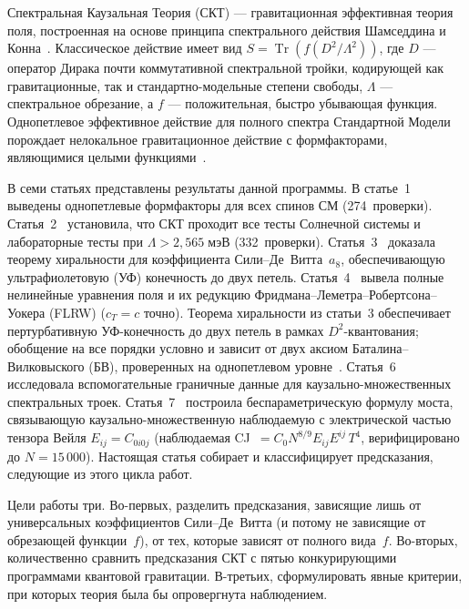 \documentclass[12pt,a4paper]{article}
\theoremstyle{plain}
\theoremstyle{definition}
\theoremstyle{remark}
\newcommand{\Tr}{\operatorname{Tr}}
\newcommand{\Esq}{E_{ij}E^{ij}}
\begin{document}
Спектральная Каузальная Теория (СКТ) --- гравитационная эффективная
теория поля, построенная на основе принципа спектрального действия
Шамседдина и Конна~\cite{CC:1996,CC:1997}. Классическое действие
имеет вид $S = \Tr(f(D^2/\Lambda^2))$, где $D$ --- оператор Дирака
почти коммутативной спектральной тройки, кодирующей как гравитационные,
так и стандартно-модельные степени свободы, $\Lambda$ --- спектральное
обрезание, а $f$ --- положительная, быстро убывающая функция.
Однопетлевое эффективное действие для полного спектра Стандартной
Модели порождает нелокальное гравитационное действие с формфакторами,
являющимися целыми функциями~\cite{Alfyorov:2026paper1}.

В семи статьях представлены результаты данной программы. В
статье~1~\cite{Alfyorov:2026paper1} выведены однопетлевые формфакторы
для всех спинов СМ (274~проверки).
Статья~2~\cite{Alfyorov:2026paper2} установила, что СКТ проходит все
тесты Солнечной системы и лабораторные тесты при
$\Lambda > 2{,}565\;\text{мэВ}$ (332~проверки).
Статья~3~\cite{Alfyorov:2026paper3} доказала теорему хиральности
для коэффициента Сили--Де~Витта~$a_8$, обеспечивающую ультрафиолетовую (УФ) конечность
до двух петель.
Статья~4~\cite{Alfyorov:2026paper4} вывела полные нелинейные
уравнения поля и их редукцию Фридмана--Леметра--Робертсона--Уокера (FLRW) ($c_T = c$ точно).
Теорема хиральности из статьи~3 обеспечивает пертурбативную
УФ-конечность до двух петель в рамках $D^2$-квантования; обобщение
на все порядки условно и зависит от двух аксиом Баталина--Вилковыского (БВ), проверенных на
однопетлевом уровне~\cite{Alfyorov:2026paper3}.
Статья~6~\cite{Alfyorov:2026paper6} исследовала вспомогательные
граничные данные для каузально-множественных спектральных троек.
Статья~7~\cite{Alfyorov:2026paper7} построила беспараметрическую
формулу моста, связывающую каузально-множественную наблюдаемую с
электрической частью тензора Вейля $E_{ij} = C_{0i0j}$
(наблюдаемая CJ~$= C_0 N^{8/9} \Esq\, T^4$,
верифицировано до $N = 15\,000$).
Настоящая статья собирает и классифицирует предсказания, следующие
из этого цикла работ.

Цели работы три. Во-первых, разделить предсказания, зависящие лишь
от универсальных коэффициентов Сили--Де~Витта (и потому не зависящие
от обрезающей функции~$f$), от тех, которые зависят от полного
вида~$f$. Во-вторых, количественно сравнить предсказания СКТ с пятью
конкурирующими программами квантовой гравитации. В-третьих,
сформулировать явные критерии, при которых теория была бы
опровергнута наблюдением.
\end{document}

